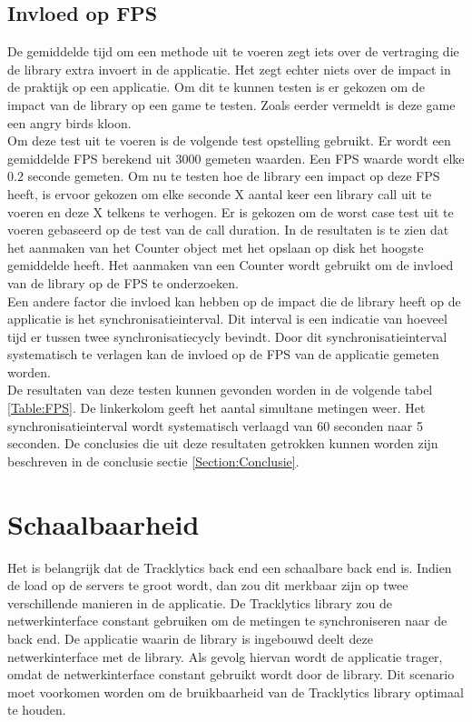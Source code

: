 \subsection{Invloed op FPS}
De gemiddelde tijd om een methode uit te voeren zegt iets over de vertraging die de library extra invoert in de applicatie. Het zegt echter niets over de impact in de praktijk op een applicatie. Om dit te kunnen testen is er gekozen om de impact van de library op een game te testen. Zoals eerder vermeldt is deze game een angry birds kloon. \\

Om deze test uit te voeren is de volgende test opstelling gebruikt. Er wordt een gemiddelde FPS berekend uit 3000 gemeten waarden. Een FPS waarde wordt elke 0.2 seconde gemeten. Om nu te testen hoe de library een impact op deze FPS heeft, is ervoor gekozen om elke seconde X aantal keer een library call uit te voeren en deze X telkens te verhogen. Er is gekozen om de worst case test uit te voeren gebaseerd op de test van de call duration. In de resultaten is te zien dat het aanmaken van het Counter object met het opslaan op disk het hoogste gemiddelde heeft. Het aanmaken van een Counter wordt gebruikt om de invloed van de library op de FPS te onderzoeken. \\

Een andere factor die invloed kan hebben op de impact die de library heeft op de applicatie is het synchronisatieinterval. Dit interval is een indicatie van hoeveel tijd er tussen twee synchronisatiecycly bevindt. Door dit synchronisatieinterval systematisch te verlagen kan de invloed op de FPS van de applicatie gemeten worden. \\

De resultaten van deze testen kunnen gevonden worden in de volgende tabel \ref{Table:FPS}. De linkerkolom geeft het aantal simultane metingen weer. Het synchronisatieinterval wordt systematisch verlaagd van 60 seconden naar 5 seconden. De conclusies die uit deze resultaten getrokken kunnen worden zijn beschreven in de conclusie sectie \ref{Section:Conclusie}.




\section{Schaalbaarheid}
Het is belangrijk dat de Tracklytics back end een schaalbare back end is. Indien de load op de servers te groot wordt, dan zou dit merkbaar zijn op twee verschillende manieren in de applicatie. De Tracklytics library zou de netwerkinterface constant gebruiken om de metingen te synchroniseren naar de back end. De applicatie waarin de library is ingebouwd deelt deze netwerkinterface met de library. Als gevolg hiervan wordt de applicatie trager, omdat de netwerkinterface constant gebruikt wordt door de library. Dit scenario moet voorkomen worden om de bruikbaarheid van de Tracklytics library optimaal te houden.\\

